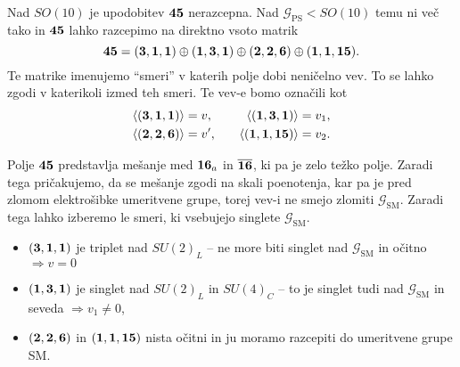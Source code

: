 Nad $SO(10)$ je upodobitev $\mathbf{45}$ nerazcepna. Nad $\mathcal{G}_\text{PS} < SO(10)$ temu ni več
tako in $\mathbf{45}$ lahko razcepimo na direktno vsoto matrik
\begin{equation}
	\mathbf{45} = (\mathbf{3}, \mathbf{1}, \mathbf{1}) \oplus (\mathbf{1}, \mathbf{3}, \mathbf{1}) \oplus (\mathbf{2}, \mathbf{2}, \mathbf{6})
		\oplus (\mathbf{1}, \mathbf{1}, \mathbf{15}).
\end{equation}
Te matrike imenujemo "`smeri"' v katerih polje dobi neničelno vev. To se lahko zgodi v katerikoli
izmed teh smeri. Te vev-e bomo označili kot
\begin{alignat}{3}
	\langle (\mathbf{3}, \mathbf{1}, \mathbf{1}) \rangle &= v, &\quad \langle (\mathbf{1}, \mathbf{3}, \mathbf{1}) \rangle &= v_1, \notag \\
	\langle	(\mathbf{2}, \mathbf{2}, \mathbf{6}) \rangle &= v', &\quad \langle (\mathbf{1}, \mathbf{1}, \mathbf{15}) \rangle &= v_2.
\end{alignat}

\noindent Polje $\mathbf{45}$ predstavlja mešanje med $\mathbf{16}_a$ in $\overline{\mathbf{16}}$, ki pa je zelo težko
polje. Zaradi tega pričakujemo, da se mešanje zgodi na skali poenotenja, kar pa je pred zlomom
elektrošibke umeritvene grupe, torej vev-i ne smejo zlomiti $\mathcal{G}_\text{SM}$. Zaradi tega
lahko izberemo le smeri, ki vsebujejo singlete $\mathcal{G}_\text{SM}$.

\begin{itemize}
	\item{$(\mathbf{3}, \mathbf{1}, \mathbf{1})$ je triplet nad $SU(2)_L$ -- ne more biti singlet nad
		$\mathcal{G}_\text{SM}$ in očitno $\Longrightarrow v = 0$}
	\item{$(\mathbf{1}, \mathbf{3}, \mathbf{1})$ je singlet nad $SU(2)_L$ in $SU(4)_C$ -- to je singlet tudi nad	
		$\mathcal{G}_\text{SM}$ in seveda $\Longrightarrow  v_1 \neq 0$,}
	\item{$(\mathbf{2}, \mathbf{2}, \mathbf{6})$ in $(\mathbf{1}, \mathbf{1}, \mathbf{15})$ nista očitni in ju moramo razcepiti do umeritvene
		grupe SM.}
\end{itemize}

